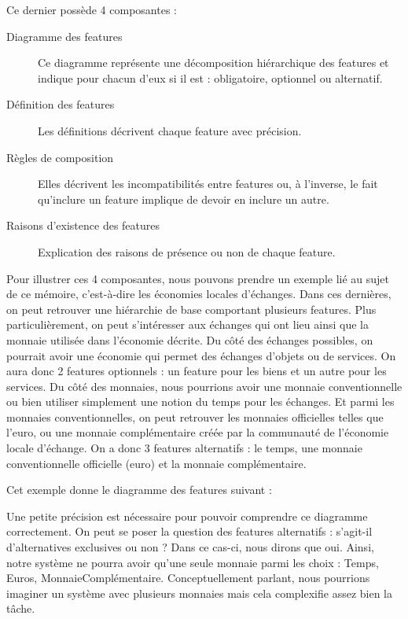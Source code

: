 Ce dernier possède 4 composantes : 

\begin{description}
	\item[Diagramme des features] Ce diagramme représente une décomposition hiérarchique des features et indique pour chacun d'eux si il est : obligatoire,  optionnel ou alternatif.
	\item[Définition des features] Les définitions décrivent chaque feature avec précision.
	\item[Règles de composition] Elles décrivent les incompatibilités entre features ou,  à l'inverse,  le fait qu'inclure un feature implique de devoir en inclure un autre.
	\item[Raisons d'existence des features] Explication des raisons de présence ou non de chaque feature.
\end{description}

Pour illustrer ces 4 composantes,  nous pouvons prendre un exemple lié au sujet de ce mémoire,  c'est-à-dire les économies locales d'échanges.  Dans ces dernières,  on peut retrouver une hiérarchie de base comportant plusieurs features.  Plus particulièrement,  on peut s'intéresser aux échanges qui ont lieu ainsi que la monnaie utilisée dans l'économie décrite.  Du côté des échanges possibles,  on pourrait avoir une économie qui permet des échanges d'objets ou de services.  On aura donc 2 features optionnels : un feature pour les biens et un autre pour les services.  Du côté des monnaies,  nous pourrions avoir une monnaie conventionnelle ou bien utiliser simplement une notion du temps pour les échanges.  Et parmi les monnaies conventionnelles,  on peut retrouver les monnaies officielles telles que l'euro,  ou une monnaie complémentaire créée par la communauté de l'économie locale d'échange.  On a donc 3 features alternatifs : le temps,  une monnaie conventionnelle officielle (euro) et la monnaie complémentaire. 

Cet exemple donne le diagramme des features suivant : 


Une petite précision est nécessaire pour pouvoir comprendre ce diagramme correctement.  On peut se poser la question des features alternatifs : s'agit-il d'alternatives exclusives ou non ?  Dans ce cas-ci,  nous dirons que oui.  Ainsi,  notre système ne pourra avoir qu'une seule monnaie parmi les choix : Temps,  Euros,  MonnaieComplémentaire.  Conceptuellement parlant,  nous pourrions imaginer un système avec plusieurs monnaies mais cela complexifie assez bien la tâche.

